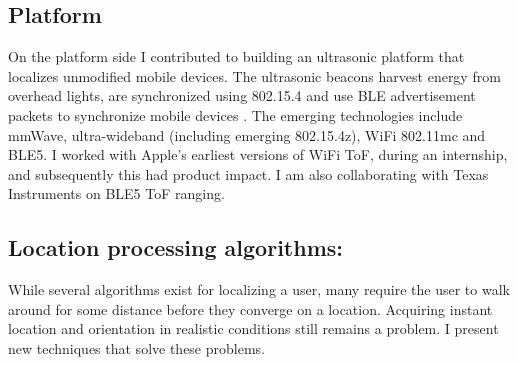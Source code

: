 \documentclass[10pt]{article}
\begin{document}

\subsection{Platform} 
On the platform side I contributed to building an ultrasonic platform that localizes unmodified mobile devices. The ultrasonic beacons harvest energy from overhead lights, are synchronized using 802.15.4 and use BLE advertisement packets to synchronize mobile devices
\cite{rtas-alps-platform, lazik2015alps,lazik2015alpsdemo}. The emerging technologies include mmWave, ultra-wideband (including emerging 802.15.4z), WiFi 802.11mc and BLE5.  I worked with Apple's earliest versions of WiFi ToF, during an internship, and subsequently this had product impact. I am also collaborating with Texas Instruments on BLE5 ToF ranging. 

\subsection{Location processing algorithms: }
While several algorithms exist for localizing a user, many require the user to walk around for some distance before they converge on a location.  Acquiring instant location and orientation in realistic conditions still remains a problem. I present new techniques that solve these problems. 
\end{document}
